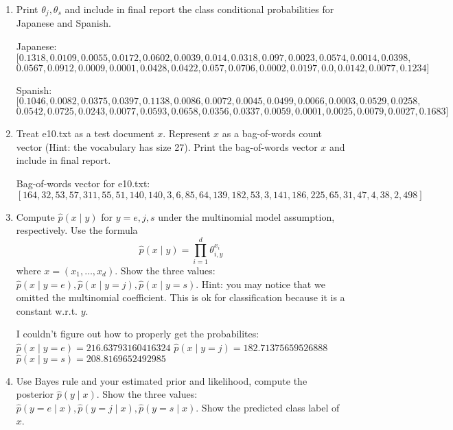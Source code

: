 \documentclass[a4paper]{article}
\theoremstyle{definition}
\newenvironment{soln}{
    \leavevmode\color{blue}\ignorespaces
}{}
\begin{document}
\begin{enumerate}
\item
Print $\theta_j, \theta_s$ and include in final report the class conditional probabilities for Japanese and Spanish.

\begin{soln}

    Japanese:
    $$[0.1318, 0.0109, 0.0055, 0.0172, 0.0602, 0.0039, 0.014, 0.0318, 0.097, 0.0023, 0.0574, 0.0014, 0.0398,$$
    $$0.0567, 0.0912, 0.0009, 0.0001, 0.0428, 0.0422, 0.057, 0.0706, 0.0002, 0.0197, 0.0, 0.0142, 0.0077, 0.1234]$$

    Spanish:
    $$[0.1046, 0.0082, 0.0375, 0.0397, 0.1138, 0.0086, 0.0072, 0.0045, 0.0499, 0.0066, 0.0003, 0.0529, 0.0258,$$
    $$0.0542, 0.0725, 0.0243, 0.0077, 0.0593, 0.0658, 0.0356, 0.0337, 0.0059, 0.0001, 0.0025, 0.0079, 0.0027, 0.1683]$$

\end{soln}


\item
Treat e10.txt as a test document $x$.
Represent $x$ as a bag-of-words count vector (Hint: the vocabulary has size 27).
Print the bag-of-words vector $x$ and include in final report.

\begin{soln}
    Bag-of-words vector for e10.txt: \\
    $$[164, 32, 53, 57, 311, 55, 51, 140, 140, 3, 6, 85, 64, 139, 182, 53, 3, 141, 186, 225, 65, 31, 47, 4, 38, 2, 498]$$
\end{soln}

\item
Compute $\hat p(x \mid y)$ for $y=e, j, s$ under the multinomial model assumption, respectively.
Use the formula
$$\hat p(x \mid y) = \prod_{i=1}^d \theta_{i, y}^{x_i}$$
where $x=(x_1, \ldots, x_d)$.
Show the three values: $\hat p(x \mid y=e), \hat p(x \mid y=j), \hat p(x \mid y=s)$.
Hint: you may notice that we omitted the multinomial coefficient.  This is ok for classification because it is a constant w.r.t. $y$.

\begin{soln}
    I couldn't figure out how to properly get the probabilites:
    $\hat p(x \mid y=e) = 216.63793160416324$
    $\hat p(x \mid y=j) = 182.71375659526888$
    $\hat p(x \mid y=s) = 208.8169652492985$
\end{soln}

\item
Use Bayes rule and your estimated prior and likelihood, compute the posterior $\hat p(y \mid x)$.
Show the three values: $\hat p(y=e \mid x), \hat p(y=j \mid x), \hat p(y=s \mid x)$.
Show the predicted class label of $x$.


\end{enumerate}
\end{document}
